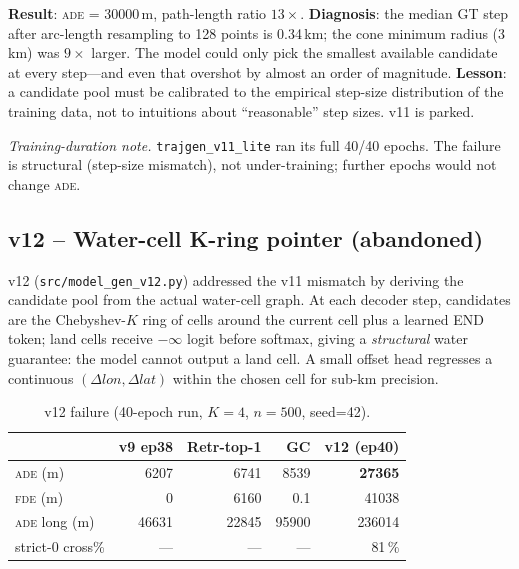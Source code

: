 \documentclass[11pt,a4paper]{article}
\newcommand{\ade}{\textsc{ade}}
\newcommand{\fde}{\textsc{fde}}
\begin{document}
\textbf{Result}: \ade{} = 30000\,m, path-length ratio $13\times$.
\textbf{Diagnosis}: the median GT step after arc-length resampling to 128 points is
0.34\,km; the cone minimum radius (3\,km) was $9\times$ larger.
The model could only pick the smallest available candidate at every step---and even
that overshot by almost an order of magnitude.
\textbf{Lesson}: a candidate pool must be calibrated to the empirical step-size
distribution of the training data, not to intuitions about ``reasonable'' step sizes.
v11 is parked.

\noindent\textit{Training-duration note.}
\texttt{trajgen\_v11\_lite} ran its full 40/40 epochs.  The failure is
structural (step-size mismatch), not under-training; further epochs would
not change \ade{}.

\subsection{v12 -- Water-cell K-ring pointer (abandoned)}
\label{sec:v12}

v12 (\texttt{src/model\_gen\_v12.py}) addressed the v11 mismatch by deriving the
candidate pool from the actual water-cell graph.
At each decoder step, candidates are the Chebyshev-$K$ ring of cells around the
current cell plus a learned END token; land cells receive $-\infty$ logit before
softmax, giving a \emph{structural} water guarantee: the model cannot output a
land cell.
A small offset head regresses a continuous $({\Delta}lon, {\Delta}lat)$ within the
chosen cell for sub-km precision.

\begin{table}[ht]
\centering
\caption{v12 failure (40-epoch run, $K=4$, $n=500$, seed=42).}
\label{tab:v12}
\begin{tabular}{lrrrr}
\toprule
 & v9 ep38 & Retr-top-1 & GC & v12 (ep40) \\
\midrule
\ade{} (m)             & 6207  & 6741  & 8539  & \textbf{27365} \\
\fde{} (m)             & 0     & 6160  & 0.1   & 41038 \\
\ade{} long (m)        & 46631 & 22845 & 95900 & 236014 \\
strict-0 cross\%       & ---   & ---   & ---   & 81\,\% \\
\bottomrule
\end{tabular}
\end{table}
\end{document}
